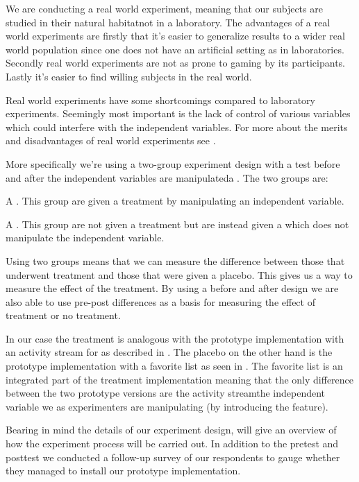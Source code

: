 We are conducting a real world experiment, meaning that our subjects
are studied in their natural habitat\dash{}not in a laboratory.
The advantages of a real world experiments are firstly that it's easier to
generalize results to a wider real world population since one does not have
an artificial setting as in laboratories. Secondly real world experiments are
not as prone to gaming by its participants. Lastly it's easier to find willing
subjects in the real world.

Real world experiments have some shortcomings compared to laboratory
experiments. Seemingly most important is the lack of control of various
variables which could interfere with the independent variables.
For more about the merits and disadvantages of real world experiments
see \citet[]{robson93}.

More specifically we're using a two-group experiment design with a test before
and after the independent variables are manipulated\dash{}a .
The two groups are:

\begin{items}
  \item A . This group are given a treatment by
    manipulating an independent variable.
  \item A . This group are not given a treatment but are
    instead given a  which does not manipulate the independent
    variable.
\end{items}

Using two groups means that we can measure the difference between those that
underwent treatment and those that were given a placebo. This gives us a way
to measure the effect of the treatment.
By using a before and after design we are also able to use pre-post
differences as a basis for measuring the effect of treatment or no
treatment.

In our case the treatment is analogous with the prototype implementation with
an activity stream for \urort{} as described in
.
The placebo on the other hand is the 
prototype implementation with a favorite list as seen in
.
The favorite list is an integrated part of the treatment implementation
meaning that the only difference between the two prototype versions are
the activity stream\dash{}the independent variable we as experimenters are
manipulating (by introducing the feature).

Bearing in mind the details of our experiment design,
 will give an overview of how the experiment
process will be carried out. In addition to the pretest and posttest we
conducted a follow-up survey of our respondents to gauge whether they managed
to install our prototype implementation.


